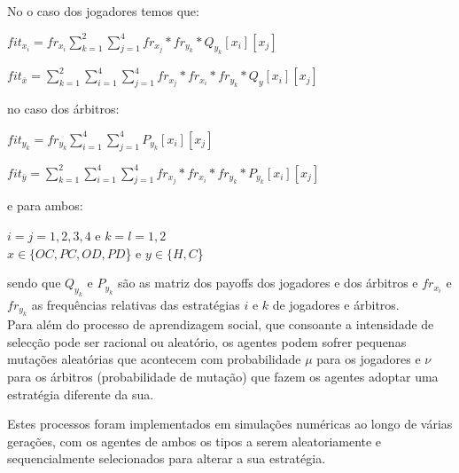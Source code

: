 \documentclass[conference, twocolumn]{IEEEtran}
\theoremstyle{plain}
\theoremstyle{definition}
\theoremstyle{remark}
\begin{document}
    No o caso dos jogadores temos que:
    \smallskip
    \begin{center}
        $fit_{x_{i}}=fr_{x_{i}}\sum_{k=1}^{2}\sum_{j=1}^{4}fr_{x_{j}}*fr_{y_{k}}*Q_{y_k}[x_i][x_j]$\\
    \end{center}

    \begin{center}
        $fit_{\bar{x}}=\sum_{k=1}^{2}\sum_{i=1}^{4}\sum_{j=1}^{4}fr_{x_{j}}*fr_{x_{i}}*fr_{y_{k}}*Q_{y}[x_i][x_j]$\\
    \end{center}

    \smallskip
    no caso dos árbitros:

    \begin{center}
        $fit_{y_{k}}=fr_{y_{k}}\sum_{i=1}^{4}\sum_{j=1}^{4}P_{y_{k}}[x_i][x_j]$ \\
    \end{center}

    \begin{center}
        $fit_{\bar{y}}=\sum_{k=1}^{2}\sum_{i=1}^{4}\sum_{j=1}^{4}fr_{x_{j}}*fr_{x_{i}}*fr_{y_{k}}*P_{y_{k}}[x_i][x_j]$\\
    \end{center}

    \smallskip
    e para ambos:
    \begin{center}
        $i=j=1,2,3,4$ e $k=l=1,2$ \\
        $x \in \{OC, PC, OD, PD$\} e $y \in \{H, C$\}\\
    \end{center}
    \smallskip
    sendo que $Q_{y_{k}}$ e $P_{y_{k}}$ são as matriz dos payoffs dos jogadores e dos árbitros e $fr_{x_{i}}$ e $fr_{y_{k}}$ as frequências relativas das estratégias $i$ e $k$ de jogadores e árbitros. \\

    Para além do processo de aprendizagem social, que consoante a intensidade de selecção pode ser racional ou aleatório, os agentes podem sofrer pequenas mutações aleatórias que acontecem com probabilidade $\mu$ para os jogadores e $\nu$ para os árbitros (probabilidade de mutação) que fazem os agentes adoptar uma estratégia diferente da sua.
    \smallskip

    Estes processos foram implementados em simulações numéricas ao longo de várias gerações, com os agentes de ambos os tipos a serem aleatoriamente e sequencialmente selecionados para alterar a sua estratégia.
\end{document}
